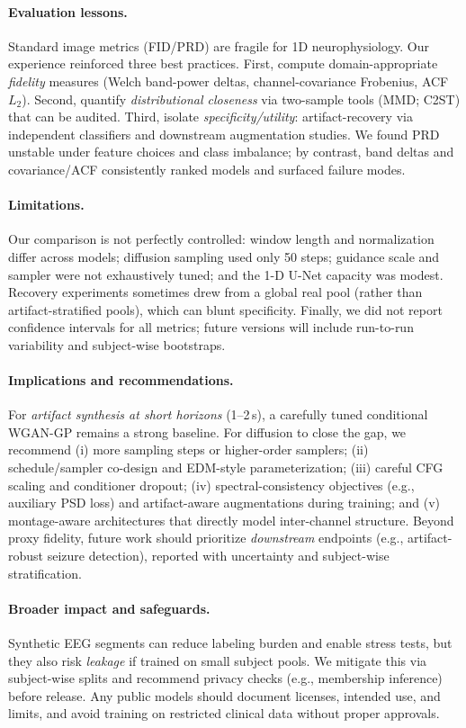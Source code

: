 \documentclass{article}
\begin{document}
\paragraph{Evaluation lessons.}
Standard image metrics (FID/PRD) are fragile for 1D neurophysiology. Our experience reinforced three best practices. First, compute domain-appropriate \emph{fidelity} measures (Welch band-power deltas, channel-covariance Frobenius, ACF~$L_2$). Second, quantify \emph{distributional closeness} via two-sample tools (MMD; C2ST) that can be audited. Third, isolate \emph{specificity/utility}: artifact-recovery via independent classifiers and downstream augmentation studies. We found PRD unstable under feature choices and class imbalance; by contrast, band deltas and covariance/ACF consistently ranked models and surfaced failure modes.

\paragraph{Limitations.}
Our comparison is not perfectly controlled: window length and normalization differ across models; diffusion sampling used only 50 steps; guidance scale and sampler were not exhaustively tuned; and the 1-D U-Net capacity was modest. Recovery experiments sometimes drew from a global real pool (rather than artifact-stratified pools), which can blunt specificity. Finally, we did not report confidence intervals for all metrics; future versions will include run-to-run variability and subject-wise bootstraps.

\paragraph{Implications and recommendations.}
For \emph{artifact synthesis at short horizons} (1–2\,s), a carefully tuned conditional WGAN-GP remains a strong baseline. For diffusion to close the gap, we recommend (i) more sampling steps or higher-order samplers; (ii) schedule/sampler co-design and EDM-style parameterization; (iii) careful CFG scaling and conditioner dropout; (iv) spectral-consistency objectives (e.g., auxiliary PSD loss) and artifact-aware augmentations during training; and (v) montage-aware architectures that directly model inter-channel structure. Beyond proxy fidelity, future work should prioritize \emph{downstream} endpoints (e.g., artifact-robust seizure detection), reported with uncertainty and subject-wise stratification.

\paragraph{Broader impact and safeguards.}
Synthetic EEG segments can reduce labeling burden and enable stress tests, but they also risk \emph{leakage} if trained on small subject pools. We mitigate this via subject-wise splits and recommend privacy checks (e.g., membership inference) before release. Any public models should document licenses, intended use, and limits, and avoid training on restricted clinical data without proper approvals.
\end{document}
